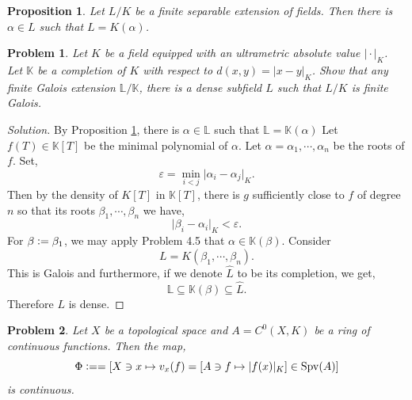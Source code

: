 \documentclass[8pt]{article}
\numberwithin{equation}{section}
\newenvironment{solution}{\begin{proof}[Solution]}{\end{proof}}
\newtheorem{proposition}{Proposition}[section]
\newtheorem{problem}{Problem}[section]
\DeclareMathOperator{\Spv}{Spv}
\newcommand{\defeq}{\vcentcolon=}
\newcommand{\ab}[1]{\vert #1 \vert}
\begin{document}
\begin{proposition}
  \label{proposition_primitive_element}
  Let $L/K$ be a finite separable extension of fields. Then there is $\alpha\in L$ such that $L = K(\alpha)$.
\end{proposition}

\begin{problem}
  Let $K$ be a field equipped with an ultrametric absolute value $\ab{\cdot}_K$. Let $\mathbb{K}$ be a completion of $K$ with respect to $d(x,y) = \ab{x-y}_K$.
  Show that any finite Galois extension $\mathbb{L}/\mathbb{K}$, there is a dense subfield $L$ such that $L/K$ is finite Galois.
\end{problem}
\begin{solution}
  By Proposition \ref{proposition_primitive_element}, there is $\alpha\in\mathbb{L}$ such that $\mathbb{L} = \mathbb{K}(\alpha)$ Let $f(T)\in \mathbb{K}[T]$ be the minimal polynomial of $\alpha$. Let $\alpha=\alpha_1,\cdots,\alpha_n$ be the roots of $f$. Set,
  \begin{equation*}
    \varepsilon = \min_{i<j}\ab{\alpha_i-\alpha_j}_K.
  \end{equation*}
  Then by the density of $K[T]$ in $\mathbb{K}[T]$, there is $g$ sufficiently close to $f$ of degree $n$ so that its roots $\beta_1,\cdots,\beta_n$ we have,
  \begin{equation*}
    \vert\beta_i-\alpha_i\vert_K<\varepsilon.
  \end{equation*}
  For $\beta\defeq\beta_1$, we may apply Problem 4.5 that $\alpha\in \mathbb{K}(\beta)$. Consider 
  \begin{equation*}
    L = K(\beta_1,\cdots,\beta_n).
  \end{equation*}
  This is Galois and furthermore, if we denote $\widehat{L}$ to be its completion, we get,
  \begin{equation*}
    \mathbb{L}\subseteq\mathbb{K}(\beta)\subseteq \hat{L}.
  \end{equation*}
  Therefore $L$ is dense.
\end{solution}
\begin{problem}
  Let $X$ be a topological space and $A=C^0(X,K)$ be a ring of continuous functions. Then the map,
  \begin{equation*}
    \Phi \defeq = [X\ni x\mapsto v_x(f) = [A\ni f\mapsto \ab{f(x)}_K]\in \Spv(A)]
  \end{equation*}
  is continuous.
\end{problem}
\end{document}
